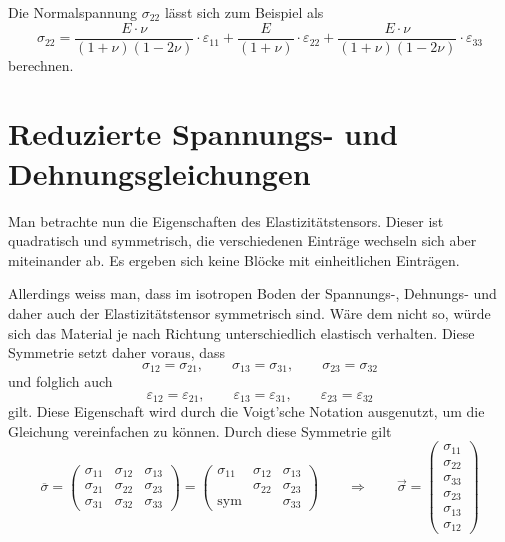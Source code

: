 Die Normalspannung $\sigma_{22}$ lässt sich zum Beispiel als
\[
\sigma_{22}
=
\frac{E\cdot\nu}{(1+\nu)(1-2\nu)}\cdot\varepsilon_{11}+\frac{E}{(1+\nu)}\cdot\varepsilon_{22}+\frac{E\cdot\nu}{(1+\nu)(1-2\nu)}\cdot\varepsilon_{33}
\]
berechnen.

\section{Reduzierte Spannungs- und Dehnungsgleichungen}

Man betrachte nun die Eigenschaften des Elastizitätstensors.
Dieser ist quadratisch und symmetrisch, die verschiedenen Einträge wechseln sich aber miteinander ab.
Es ergeben sich keine Blöcke mit einheitlichen Einträgen.

Allerdings weiss man, dass im isotropen Boden der Spannungs-, Dehnungs- und daher auch der Elastizitätstensor symmetrisch sind.
Wäre dem nicht so, würde sich das Material je nach Richtung unterschiedlich elastisch verhalten.
Diese Symmetrie setzt daher voraus, dass
\[
\sigma_{12}
=
\sigma_{21}
,
\qquad
\sigma_{13}
=
\sigma_{31}
,
\qquad
\sigma_{23}
=
\sigma_{32}
\]
und folglich auch
\[
\varepsilon_{12}
=
\varepsilon_{21}
,
\qquad
\varepsilon_{13}
=
\varepsilon_{31}
,
\qquad
\varepsilon_{23}
=
\varepsilon_{32}
\]
gilt.
Diese Eigenschaft wird durch die Voigt'sche Notation \cite{spannung:Voigtsche-Notation} ausgenutzt, um die Gleichung vereinfachen zu können.
%
Durch diese Symmetrie gilt
\[
\overline{\sigma}
=
\begin{pmatrix}
	\sigma_{11} & \sigma_{12} & \sigma_{13} \\ 
	\sigma_{21} & \sigma_{22} & \sigma_{23} \\
	\sigma_{31} & \sigma_{32} & \sigma_{33}
\end{pmatrix}
=
\begin{pmatrix}
	\sigma_{11} & \sigma_{12} & \sigma_{13} \\ 
  	            & \sigma_{22} & \sigma_{23} \\
	 \text{sym} &             & \sigma_{33} 
\end{pmatrix}
\qquad
\Rightarrow
\qquad
\vec{\sigma}
=
\begin{pmatrix}
    \sigma_{11}\\
	\sigma_{22}\\
	\sigma_{33}\\
	\sigma_{23}\\
	\sigma_{13}\\
	\sigma_{12}
\end{pmatrix}
\]
